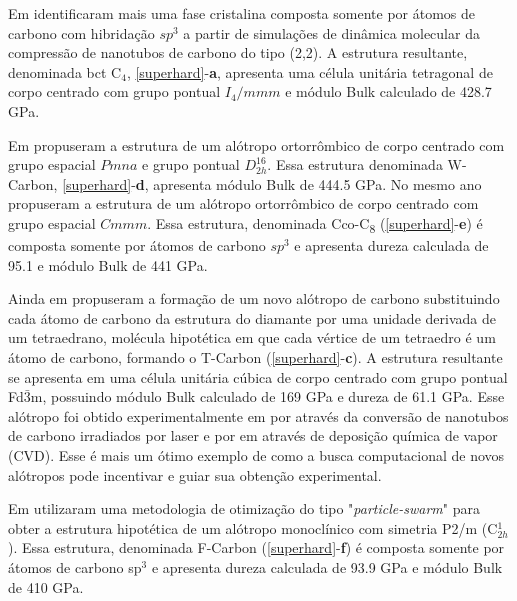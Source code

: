 		Em \citeyear{umemoto2010body} \citeauthor{umemoto2010body} identificaram mais uma fase cristalina composta somente por átomos de carbono com hibridação $sp^3$ a partir de simulações de dinâmica molecular da compressão de nanotubos de carbono do tipo (2,2). A estrutura resultante, denominada bct C$_4$, \autoref{superhard}-\textbf{a}, apresenta uma célula unitária tetragonal de corpo centrado com grupo pontual $I_4/mmm$ e módulo Bulk calculado de 428.7 GPa.
		
		Em \citeyear{wang2011low} \citeauthor{wang2011low} propuseram a estrutura de um alótropo ortorrômbico de corpo centrado com grupo espacial $Pmna$ e grupo pontual $D^{16}_{2h}$. Essa estrutura denominada W-Carbon, \autoref{superhard}-\textbf{d}, apresenta módulo Bulk de 444.5 GPa. No mesmo ano \citeauthor{zhao2011novel} propuseram a estrutura de um alótropo ortorrômbico de corpo centrado com grupo espacial $Cmmm$. Essa estrutura, denominada Cco-C\textsubscript{8} (\autoref{superhard}-\textbf{e}) é composta somente por átomos de carbono $sp^3$ e apresenta dureza calculada de 95.1 e módulo Bulk de 441 GPa. 
		
		Ainda em \citeyear{sheng2011t} \citeauthor{sheng2011t} propuseram a formação de um novo alótropo de carbono substituindo cada átomo de carbono da estrutura do diamante por uma unidade derivada de um tetraedrano, molécula hipotética em que cada vértice de um tetraedro é um átomo de carbono, formando o T-Carbon (\autoref{superhard}-\textbf{c}). A estrutura resultante se apresenta em uma célula unitária cúbica de corpo centrado com grupo pontual Fd$\bar{3}$m, possuindo módulo Bulk calculado de 169 GPa e dureza de 61.1 GPa. Esse alótropo foi obtido experimentalmente em \citeyear{zhang2017pseudo} por \citeauthor{zhang2017pseudo} através da conversão de nanotubos de carbono irradiados por laser e por \citeauthor{xu2020preparation} em \citeyear{xu2020preparation} através de deposição química de vapor (CVD). Esse é mais um ótimo exemplo de como a busca computacional de novos alótropos pode incentivar e guiar sua obtenção experimental.
		
		Em \citeyear{tian2012superhard} \citeauthor{tian2012superhard} utilizaram uma metodologia de otimização do tipo "\textit{particle-swarm}" para obter a estrutura hipotética de um alótropo monoclínico com simetria P2/m (C$^{1}_{2h}$). Essa estrutura, denominada F-Carbon (\autoref{superhard}-\textbf{f}) é composta somente por átomos de carbono sp$^3$ e apresenta dureza calculada de 93.9 GPa e módulo Bulk de 410 GPa.
		
